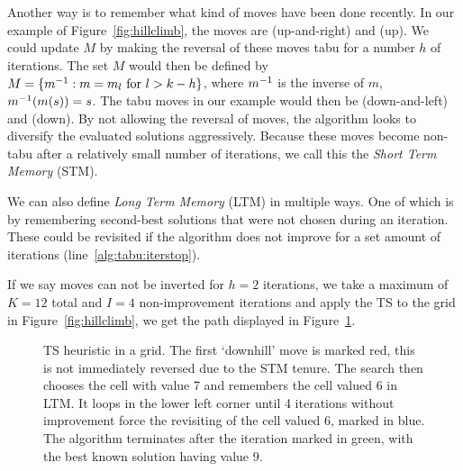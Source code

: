 Another way is to remember what kind of moves have been done recently. In our example of Figure~\ref{fig:hillclimb}, the moves are (up-and-right) and (up). We could update $M$ by making the reversal of these moves tabu for a number $h$ of iterations. The set $M$ would then be defined by $M = \{m^{-1} : m = m_l \text{ for } l > k - h\}$, where $m^{-1}$ is the inverse of $m$, $m^{-1}(m(s)) = s$. The tabu moves in our example would then be (down-and-left) and (down). By not allowing the reversal of moves, the algorithm looks to diversify the evaluated solutions aggressively. Because these moves become non-tabu after a relatively small number of iterations, we call this the \emph{Short Term Memory} (STM).

We can also define \emph{Long Term Memory} (LTM) in multiple ways. One of which is by remembering second-best solutions that were not chosen during an iteration. These could be revisited if the algorithm does not improve for a set amount of iterations (line~\ref{alg:tabu:iterstop}).

If we say moves can not be inverted for $h = 2$ iterations, we take a maximum of $K = 12$ total and $I = 4$ non-improvement iterations and apply the TS to the grid in Figure~\ref{fig:hillclimb}, we get the path displayed in Figure~\ref{fig:tabusearch}.


\begin{figure}[h]
    \centering
    \caption{TS heuristic in a grid. The first `downhill' move is marked red, this is not immediately reversed due to the STM tenure. The search then chooses the cell with value 7 and remembers the cell valued 6 in LTM. It loops in the lower left corner until 4 iterations without improvement force the revisiting of the cell valued 6, marked in blue. The algorithm terminates after the iteration marked in green, with the best known solution having value 9.}
    \label{fig:tabusearch}
\end{figure}

